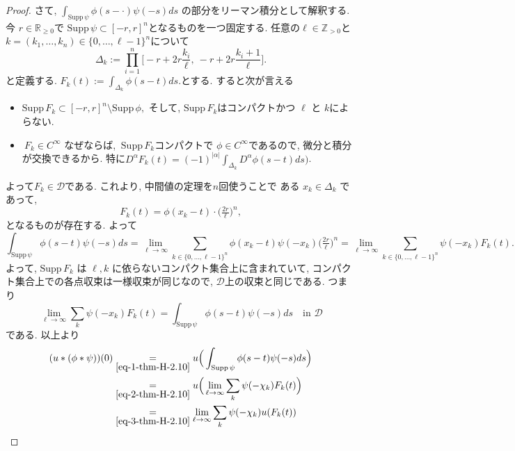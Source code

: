 \begin{proof}
さて, \(\int_{\mathrm{Supp}\,\psi} \phi(s-\cdot)\psi(-s) ds\) の部分をリーマン積分として解釈する. 
今 \(r \in \mathbb{R}_{\geq 0}\)で \(\mathrm{Supp}\,\psi \subset [-r,r]^n\)となるものを一つ固定する. 
任意の\( \ell \in \mathbb{Z}_{>0}\)と\(k = (k_1,\ldots,k_n) \in \{0,\ldots,\ell-1\}^n\)について
\[
\Delta_k := \prod_{i=1}^n \big[-r+2r\frac{k_i}{\ell}, \ -r+2r\frac{k_i+1}{\ell}\big].
\]
と定義する.
 \(F_k(t) := \int_{\Delta_k} \phi(s-t) ds.\)とする. 
 すると次が言える
 \begin{itemize}
 \item \(\mathrm{Supp}\,F_k \subset [-r,r]^n \setminus \mathrm{Supp}\,\phi,\) そして, $\mathrm{Supp}\,F_k $はコンパクトかつ \(\ell\) と \(k\)によらない. 
 \item \( \ F_k \in C^\infty\)  なぜならば, 
\(\ \mathrm{Supp}\,F_k\)コンパクトで \(\phi \in C^\infty\)であるので, 微分と積分が交換できるから. 特に\(D^\alpha F_k(t) = (-1)^{|\alpha|} \int_{\Delta_k} D^\alpha \phi(s-t) ds \Big)\).
 \end{itemize}
よって\(F_k \in \mathcal{D}\)である.
これより, 中間値の定理を$n$回使うことで
ある \( x_k \in \Delta_k\) であって, 
\begin{equation}
\label{eq-4-thm-H-2.10}
F_k(t) = \phi(x_k - t) \cdot \Big(\tfrac{2r}{\ell}\Big)^n,
\end{equation}
となるものが存在する. よって
\begin{equation}
\label{eq-3-thm-H-2.10}
\int_{\mathrm{Supp}\,\psi} \phi(s-t)\psi(-s)ds 
= \lim_{\ell \to \infty} \sum_{k \in \{0,\ldots,\ell-1\}^n} \phi(x_k - t)\psi(-x_k)\Big(\tfrac{2r}{\ell}\Big)^n
= \lim_{\ell \to \infty} \sum_{k \in \{0,\ldots,\ell-1\}^n} \psi(-x_k) F_k(t).
\end{equation}
よって, \( \mathrm{Supp}\,F_k\) は \(\ell, k\) に依らないコンパクト集合上に含まれていて,  
コンパクト集合上での各点収束は一様収束が同じなので, $\mathcal{D}$上の収束と同じである. 
つまり 
\begin{equation}
\label{eq-2-thm-H-2.10}
\lim_{\ell \to \infty} \sum_k \psi(-x_k) F_k(t) 
= \int_{\mathrm{Supp}\,\psi} \phi(s-t)\psi(-s) ds
\quad
\text{in $\mathcal{D}$}
\end{equation}
である.
以上より
\begin{align*}
(u \ast (\phi \ast \psi))(0) 
&\underset{\eqref{eq-1-thm-H-2.10}}{=} u\Big( \int_{\mathrm{Supp}\,\psi} \phi(s-t)\psi(-s) ds \Big) \\
&\underset{\eqref{eq-2-thm-H-2.10}}{=}  u\Big( \lim_{\ell \to \infty} \sum_k \psi(-\chi_k) F_k(t) \Big) \\
&\underset{\eqref{eq-3-thm-H-2.10}}{=} \lim_{\ell \to \infty} \sum_k \psi(-\chi_k) u(F_k(t))
\end{align*}


\end{proof}
